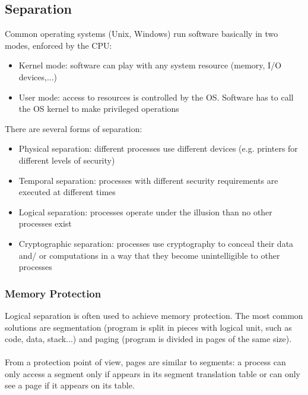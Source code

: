 \documentclass[10pt,a4paper]{report}
\begin{document}
\subsection{Separation}
Common operating systems (Unix, Windows) run software basically in two modes, enforced by the CPU:
\begin{itemize}
\item Kernel mode: software can play with any system resource (memory, I/O devices,...)
\item User mode: access to resources is controlled by the OS. Software has to call the OS kernel to make privileged
operations
\end{itemize}
There are several forms of separation:
\begin{itemize}
\item Physical separation: different processes use different devices (e.g. printers for different levels of security)
\item Temporal separation: processes with different security requirements are executed at different times
\item Logical separation: processes operate under the illusion than no other processes exist
\item Cryptographic separation: processes use cryptography to conceal their data and/ or computations in a way that they become unintelligible to other processes
\end{itemize}
\subsubsection{Memory Protection}
Logical separation is often used to achieve memory protection. The most common solutions are segmentation (program is split in pieces with logical unit, such as code, data, stack...) and paging (program is divided in pages of the same size).\\
\\
From a protection point of view, pages are similar to segments: a process can only  access a segment only if appears in its segment translation table or can only see a page if it appears on its table.
\end{document}
